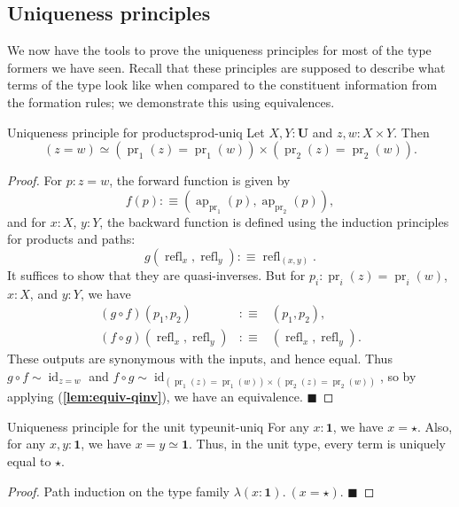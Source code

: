 \documentclass{article}
\renewcommand{\qed}{\hfill{\color{MPBthm}\( \blacksquare \)}}
\newcommand{\eql}{\mathbin{:\equiv}}
\newcommand{\U}{\mathbf{U}}
\DeclareMathOperator{\pr}{pr}
\newcommand{\1}{\textbf{1}}
\newcommand{\0}{\mathbf{0}}
\newcommand{\2}{\textbf{2}}
\DeclareMathOperator{\refl}{refl}
\DeclareMathOperator{\ap}{ap}
\DeclareMathOperator{\id}{id}
\begin{document}
\subsection{Uniqueness principles}
We now have the tools to prove the uniqueness principles for most of the type formers we have seen. Recall that these principles are supposed to describe what terms of the type look like when compared to the constituent information from the formation rules; we demonstrate this using equivalences.
\begin{thm}{Uniqueness principle for products}{prod-uniq} Let \( X, Y : \U \) and \( z, w : X \times Y \). Then
\[ (z = w) \simeq (\pr_{1}(z) = \pr_{1}(w)) \times (\pr_{2}(z) = \pr_{2}(w)). \]
\begin{proof}
	For \( p : z = w \), the forward function is given by
	\[ f(p) \eql (\ap_{\pr_{1}}(p), \ap_{\pr_{2}}(p)), \]
	and for \( x : X \), \( y : Y \), the backward function is defined using the induction principles for products and paths:
	\[ g(\refl_{x}, \refl_{y}) \eql {\refl_{(x, y)}}. \]
	It suffices to show that they are quasi-inverses. But for \( p_{i} : \pr_{i}(z) = \pr_{i}(w) \), \( x : X \), and \( y : Y \), we have
	\[ \begin{array}{rcl}
		(g \circ f)(p_{1}, p_{2}) &\eql& (p_{1}, p_{2}), \\
		(f \circ g)(\refl_{x}, \refl_{y}) &\eql& (\refl_{x}, \refl_{y}).
	\end{array} \]
	These outputs are synonymous with the inputs, and hence equal. Thus \( g \circ f \sim \id_{z = w} \) and \( f \circ g \sim \id_{(\pr_{1}(z) = \pr_{1}(w)) \times (\pr_{2}(z) = \pr_{2}(w))} \), so by applying (\textbf{\color{MPBthm}\ref{lem:equiv-qinv}}), we have an equivalence. \qed
\end{proof} \end{thm}
\begin{thm}{Uniqueness principle for the unit type}{unit-uniq} For any \( x : \1 \), we have \( x = \star \). Also, for any \( x, y : \1 \), we have \( x = y \simeq \1 \). Thus, in the unit type, every term is uniquely equal to \( \star \).
\begin{proof} Path induction on the type family \( \lambda(x : \1).~ (x = \star) \). \qed \end{proof} \end{thm}
\end{document}
